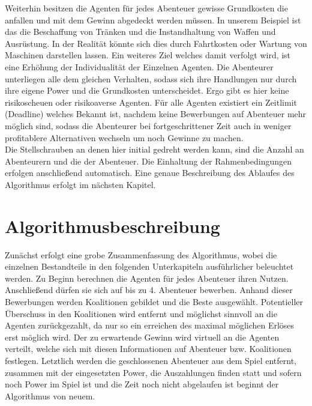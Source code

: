 \documentclass[fleqn,10pt]{article} %
\begin{document}
Weiterhin besitzen die Agenten für jedes Abenteuer gewisse Grundkosten die anfallen und mit dem Gewinn abgedeckt werden müssen. In unserem Beispiel ist das die Beschaffung von Tränken und die Instandhaltung von Waffen und Ausrüstung. In der Realität könnte sich dies durch Fahrtkosten oder Wartung von Maschinen darstellen lassen. Ein weiteres Ziel welches damit verfolgt wird, ist eine Erhöhung der Individualität der Einzelnen Agenten. Die Abenteurer unterliegen alle dem gleichen Verhalten, sodass sich ihre Handlungen nur durch ihre eigene Power und die Grundkosten unterscheidet. Ergo gibt es hier keine risikoscheuen oder risikoaverse Agenten. Für alle Agenten existiert ein Zeitlimit (Deadline) welches Bekannt ist, nachdem keine Bewerbungen auf Abenteuer mehr möglich sind, sodass die Abenteurer bei fortgeschrittener Zeit auch in weniger profitablere Alternativen wechseln um noch Gewinne zu machen.\\
Die Stellschrauben an denen hier initial gedreht werden kann, sind die Anzahl an Abenteurern und die der Abenteuer. Die Einhaltung der Rahmenbedingungen erfolgen anschließend automatisch. Eine genaue Beschreibung des Ablaufes des Algorithmus erfolgt im nächsten Kapitel.\\






\section{Algorithmusbeschreibung}
\label{sec:Algorithmus}
Zunächst erfolgt eine grobe Zusammenfassung des Algorithmus, wobei die einzelnen Bestandteile in den folgenden Unterkapiteln ausführlicher beleuchtet werden. Zu Beginn berechnen die Agenten für jedes Abenteuer ihren Nutzen. Anschließend dürfen sie sich auf bis zu 4. Abenteuer bewerben. Anhand dieser Bewerbungen werden Koalitionen gebildet und die Beste ausgewählt. Potentieller Überschuss in den Koalitionen wird entfernt und möglichst sinnvoll an die Agenten zurückgezahlt, da nur so ein erreichen des maximal möglichen Erlöses erst möglich wird. Der zu erwartende Gewinn wird virtuell an die Agenten verteilt, welche sich mit diesen Informationen auf Abenteuer bzw. Koalitionen festlegen. Letztlich werden die geschlossenen Abenteuer aus dem Spiel entfernt, zusammen mit der eingesetzten Power, die Auszahlungen finden statt und sofern noch Power im Spiel ist und die Zeit noch nicht abgelaufen ist beginnt der Algorithmus von neuem.
\end{document}
